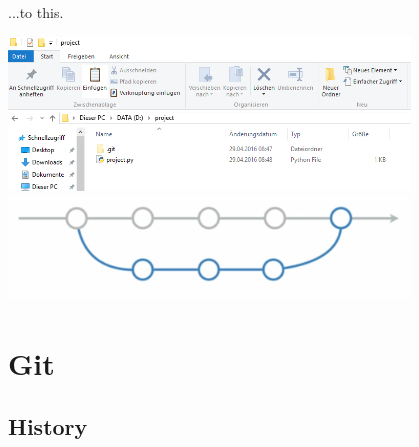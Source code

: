 \documentclass[xcolor=dvipsnames]{beamer}
\begin{document}
\begin{frame}{...to this.}


\includegraphics[width = 0.8\textwidth]{ordentlich.png}
\\
\includegraphics[width = 0.8\textwidth]{ordentlich2.png}


\end{frame}


\section{Git}

\subsection{History}
\end{document}
